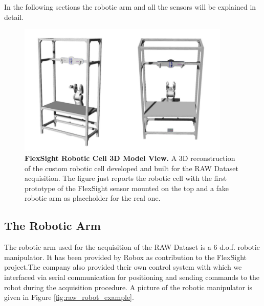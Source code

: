 In the following sections the robotic arm and all the sensors will be explained in detail.

\begin{figure}
    \centering
    \includegraphics[width=0.9\textwidth]{figures/3_raw_dataset/raw_cell_example}
    \caption{\textbf{FlexSight Robotic Cell 3D Model View.} A 3D reconstruction of the custom robotic cell developed and built for the RAW Dataset acquisition. The figure just reports the robotic cell with the first prototype of the FlexSight sensor mounted on the top and a fake robotic arm as placeholder for the real one.}
    \label{fig:raw_cell_example}
\end{figure}

\subsection{The Robotic Arm}\label{subsec:raw_setup_robot}
The robotic arm used for the acquisition of the RAW Dataset is a 6 d.o.f. robotic manipulator. It has been provided by Robox as contribution to the FlexSight project.The company also provided their own control system with which we interfaced via serial communication for positioning and sending commands to the robot during the acquisition procedure. A picture of the robotic manipulator is given in Figure \ref{fig:raw_robot_example}.

